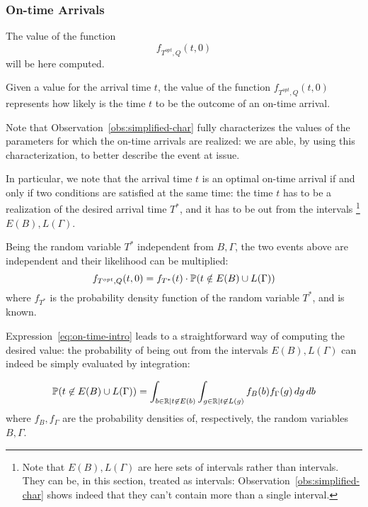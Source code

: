 \subsubsection{On-time Arrivals}

The value of the function
\begin{equation*}
  f_{T^{opt}, Q}(t, 0)
\end{equation*}
will be here computed.

Given a value for the arrival time \(t\),
the value of the function \(f_{T^{opt}, Q}(t, 0)\) represents how likely is the time \(t\) to be the outcome of an on-time arrival.

Note that Observation~\ref{obs:simplified-char} fully characterizes the values of the parameters for which the on-time arrivals are realized:
we are able, by using this characterization, to better describe the event at issue.

In particular, we note that the arrival time \(t\) is an optimal on-time arrival if and only if two conditions are satisfied at the same time:
the time \(t\) has to be a realization of the desired arrival time \(T^*\),
and it has to  be out from the intervals
\footnote{
  Note that \(E(B), L(\Gamma)\) are here sets of intervals rather than intervals.
  They can be, in this section, treated as intervals:
  Observation~\ref{obs:simplified-char} shows indeed that they can't contain more than a single interval.
}
\(E(B), L(\Gamma)\).

Being the random variable \(T^*\) independent from \(B, \Gamma\),
the two events above are independent and their likelihood can be multiplied:
\begin{equation}
  \label{eq:on-time-intro}
  f_{T^{opt}, Q}(t, 0) = f_{T^*}(t) \cdot \mathbb{P}(t \notin E(B) \cup L(\Gamma))
\end{equation}
where \(f_{T^*}\) is the probability density function of the random variable \(T^*\), and is known.

Expression~\eqref{eq:on-time-intro} leads to a straightforward way of computing the desired value:
the probability of being out from the intervals \(E(B), L(\Gamma)\) can indeed be simply evaluated by integration:

\begin{equation}
  \label{eq:prob-not-intervals}
  \mathbb{P}( t \not\in E(B) \cup L(\Gamma)) = \int_{b\in \mathbb{R} \vert t \not\in E(b)}\int_{g \in \mathbb{R} \vert t \not\in L(g)}f_B(b)f_\Gamma(g)\, dg\, db
\end{equation}
where \(f_B, f_\Gamma\) are the probability densities of, respectively, the random variables \(B, \Gamma\).


